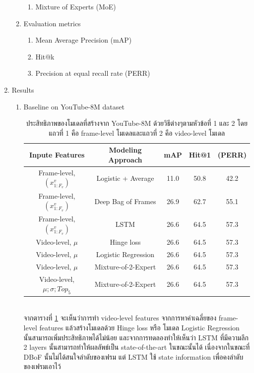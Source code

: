 \begin{enumerate}
\begin{enumerate}
\begin{enumerate}
			\item Mixture of Experts (MoE)
		\end{enumerate}
		\item Evaluation metrics
		\begin{enumerate}
			\setlength\itemsep{-0.25em}
			\item Mean Average Precision (mAP)
			\item Hit@k
			\item Precision at equal recall rate (PERR)
		\end{enumerate}
	\end{enumerate}
	\item Results
	\begin{enumerate}
		\setlength\itemsep{-0.25em}
		\item Baseline on YouTube-8M dataset
\begin{table}[!ht]
\centering
\begin{tabular}{|c|c|c|c|c|}
		\hline
		{Inpute Features}&{Modeling Approach}&{mAP}&{Hit@1}&{(PERR)}\\
		\hline
		Frame-level, $(x_{1:F_{v}}^{v})$	& Logistic + Average		& 11.0		& 50.8		& 42.2					\\
		Frame-level, $(x_{1:F_{v}}^{v})$	& Deep Bag of Frames	& 26.9		& 62.7		& 55.1					\\
		Frame-level, $(x_{1:F_{v}}^{v})$	& LSTM				& 26.6		& 64.5		& 57.3					\\
		\hline
		Video-level, $\mu$					& Hinge loss					& 26.6		& 64.5		& 57.3				\\
		Video-level, $\mu$					& Logistic Regression				& 26.6		& 64.5		& 57.3				\\
		Video-level, $\mu$					& Mixture-of-2-Expert				& 26.6		& 64.5		& 57.3				\\
		Video-level, $\mu ; \sigma ; Top_{5} $	& Mixture-of-2-Expert				& 26.6		& 64.5		& 57.3				\\
		\hline
	\end{tabular}
	\caption{ประสิทธิภาพของโมเดลที่สร้างจาก YouTube-8M ด้วยวิธีต่างๆตามหัวข้อที่ 1 และ 2 โดยแถวที่ 1 คือ frame-level โมเดลและแถวที่ 2 คือ video-level โมเดล}
	\label{tab: ประสิทธิภาพของโมเดลที่สร้างจาก YouTube-8M}
\end{table}
\\
		จากตารางที่ \ref{tab: ประสิทธิภาพของโมเดลที่สร้างจาก YouTube-8M} จะเห็นว่าการทำ video-level features จากการหาค่าเฉลี่ยของ frame-level features แล้วสร้างโมเดลด้วย Hinge loss หรือ โมเดล Logistic Regression นั้นสามารถเพิ่มประสิทธิภาพได้ไม่น้อย และจากการทดลองทำให้เห็นว่า LSTM ที่มีความลึก 2 layers นั้นสามารถทำให้ผลลัพธ์เป็น state-of-the-art ในขณะนั้นได้ เนื่องจากในขณะที่ DBoF นั้นไม่ได้สนใจลำดับของเฟรม แต่ LSTM ใช้ state information เพื่อคงลำดับของเฟรมเอาไว้

\end{enumerate}
\end{enumerate}
